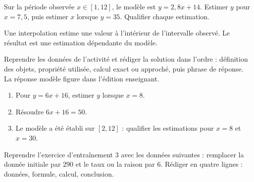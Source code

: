 \begin{activite}
Sur la période observée $x\in[1,12]$, le modèle est $y=2{,}8x+14$. Estimer $y$ pour $x=7{,}5$, puis estimer $x$ lorsque $y=35$. Qualifier chaque estimation.
\begin{center}\end{center}
\end{activite}

\begin{traceecrite}Une interpolation estime une valeur à l'intérieur de l'intervalle observé. Le résultat est une estimation dépendante du modèle.\end{traceecrite}

\begin{exemple}
Reprendre les données de l'activité et rédiger la solution dans l'ordre : définition des objets, propriété utilisée, calcul exact ou approché, puis phrase de réponse. La réponse modèle figure dans l'édition enseignant.
\end{exemple}

\begin{exercice}[-- essentiel]
\begin{enumerate}\item Pour $y=6x+16$, estimer $y$ lorsque $x=8$.\item Résoudre $6x+16=50$.\item Le modèle a été établi sur $[2,12]$ : qualifier les estimations pour $x=8$ et $x=30$.\end{enumerate}
\end{exercice}


\begin{dm}Reprendre l'exercice d'entraînement 3 avec les données suivantes : remplacer la donnée initiale par $290$ et le taux ou la raison par $6$. Rédiger en quatre lignes : données, formule, calcul, conclusion.\end{dm}

